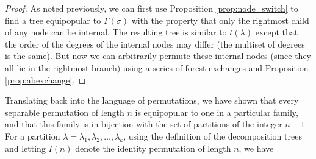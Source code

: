 \documentclass[10pt]{article}
\theoremstyle{definition}
\numberwithin{equation}{section}
\numberwithin{figure}{section}
\begin{document}
\begin{proof}
As noted previously, we can first use Proposition \ref{prop:node_switch} to find a tree equipopular to $\Gamma(\sigma)$ with the property that only the rightmost child of any node can be internal. The resulting tree is similar to $t(\lambda)$ except that the order of the degrees of the internal nodes may differ (the multiset of degrees is the same). But now we can arbitrarily permute these internal nodes (since they all lie in the rightmost branch) using a series of forest-exchanges and Proposition \ref{prop:abexchange}.
%
%
%
  \end{proof}
  
Translating back into the language of permutations, we have shown that every separable permutation of length $n$ is equipopular to one in a particular family, and that this family is in bijection with the set of partitions of the integer $n-1$. For a partition $\lambda = \lambda_1, \lambda_2, \dots, \lambda_k$, using the definition of the decomposition trees and letting $I(n)$ denote the identity permutation of length $n$, we have 
\end{document}
